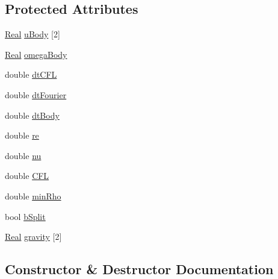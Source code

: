 \subsection*{Protected Attributes}
\begin{DoxyCompactItemize}
\item 
\hyperlink{_h_d_f5_dumper_8h_a445a5f0e2a34c9d97d69a3c2d1957907}{Real} \hyperlink{class_sim___f_s_i___gravity_af025ee4e8818049798588010ed5ec20b}{u\+Body} \mbox{[}2\mbox{]}
\item 
\hyperlink{_h_d_f5_dumper_8h_a445a5f0e2a34c9d97d69a3c2d1957907}{Real} \hyperlink{class_sim___f_s_i___gravity_aaae0c523f41a6427f5ade85a53ab6e0e}{omega\+Body}
\item 
double \hyperlink{class_sim___f_s_i___gravity_acb747fc432b79e9f03348d74bcc929d0}{dt\+C\+F\+L}
\item 
double \hyperlink{class_sim___f_s_i___gravity_a4264fa344adca71913d1f4f085bd3c36}{dt\+Fourier}
\item 
double \hyperlink{class_sim___f_s_i___gravity_aa5eb5526dc487939dc0ef241e904481c}{dt\+Body}
\item 
double \hyperlink{class_sim___f_s_i___gravity_a98ecb780308dab7b8460f1b1366a0b95}{re}
\item 
double \hyperlink{class_sim___f_s_i___gravity_af18fe419afa26a1855d8cb2803eef039}{nu}
\item 
double \hyperlink{class_sim___f_s_i___gravity_ac73b8e37488e3f55a67d3b62eb4a98bf}{C\+F\+L}
\item 
double \hyperlink{class_sim___f_s_i___gravity_a29e377488239d27f0a112ce9e4bf1e97}{min\+Rho}
\item 
bool \hyperlink{class_sim___f_s_i___gravity_ab2ec5a560dba9573d0c78325ae6b3661}{b\+Split}
\item 
\hyperlink{_h_d_f5_dumper_8h_a445a5f0e2a34c9d97d69a3c2d1957907}{Real} \hyperlink{class_sim___f_s_i___gravity_a4056a32c94c0375219f3248e29df7535}{gravity} \mbox{[}2\mbox{]}
\end{DoxyCompactItemize}


\subsection{Constructor \& Destructor Documentation}
\hypertarget{class_sim___f_s_i___gravity_a66f07ee31fb03d03da96cb53ec48af9d}{}
